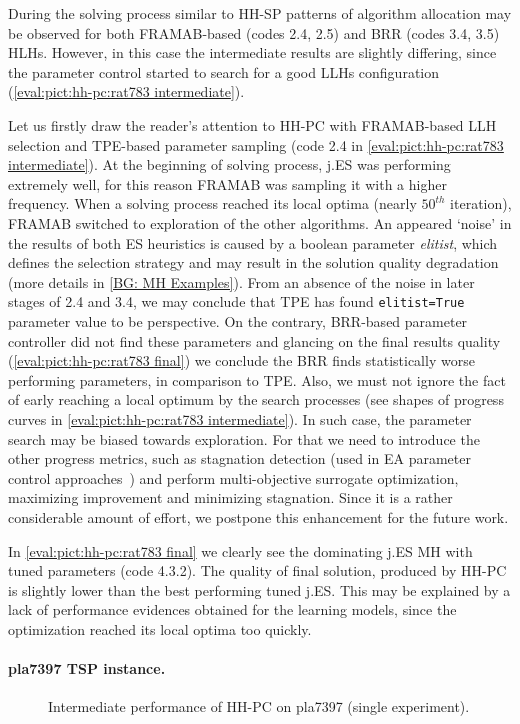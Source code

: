 During the solving process similar to HH-SP patterns of algorithm allocation may be observed for both FRAMAB-based (codes 2.4, 2.5) and BRR (codes 3.4, 3.5) HLHs. However, in this case the intermediate results are slightly differing, since the parameter control started to search for a good LLHs configuration (\cref{eval:pict:hh-pc:rat783 intermediate}). 

Let us firstly draw the reader's attention to HH-PC with FRAMAB-based LLH selection and TPE-based parameter sampling (code 2.4 in \cref{eval:pict:hh-pc:rat783 intermediate}). At the beginning of solving process, j.ES was performing extremely well, for this reason FRAMAB was sampling it with a higher frequency. When a solving process reached its local optima (nearly $50^{th}$ iteration), FRAMAB switched to exploration of the other algorithms. An appeared `noise' in the results of both ES heuristics is caused by a boolean parameter \emph{elitist}, which defines the selection strategy and may result in the solution quality degradation (more details in \cref{BG: MH Examples}). From an absence of the noise in later stages of 2.4 and 3.4, we may conclude that TPE has found \texttt{elitist=True} parameter value to be perspective. On the contrary, BRR-based parameter controller did not find these parameters and glancing on the final results quality (\cref{eval:pict:hh-pc:rat783 final}) we conclude the BRR finds statistically worse performing parameters, in comparison to TPE. Also, we must not ignore the fact of early reaching a local optimum by the search processes (see shapes of progress curves in \cref{eval:pict:hh-pc:rat783 intermediate}). In such case, the parameter search may be biased towards exploration. For that we need to introduce the other progress metrics, such as stagnation detection (used in EA parameter control approaches~\cite{karafotias2014generic}) and perform multi-objective surrogate optimization, maximizing improvement and minimizing stagnation. Since it is a rather considerable amount of effort, we postpone this enhancement for the future work.

In \cref{eval:pict:hh-pc:rat783 final} we clearly see the dominating j.ES MH with tuned parameters (code 4.3.2). The quality of final solution, produced by HH-PC is slightly lower than the best performing tuned j.ES. This may be explained by a lack of performance evidences obtained for the learning models, since the optimization reached its local optima too quickly.


\paragraph{pla7397 TSP instance.}
\begin{figure}[t]
	\centering
	\vspace{-20pt}
	
	\caption{Intermediate performance of HH-PC on pla7397 (single experiment).}
	\vspace{-5pt}
	\label{eval:pict:hh-pc:pla7397 intermediate}
\end{figure}


